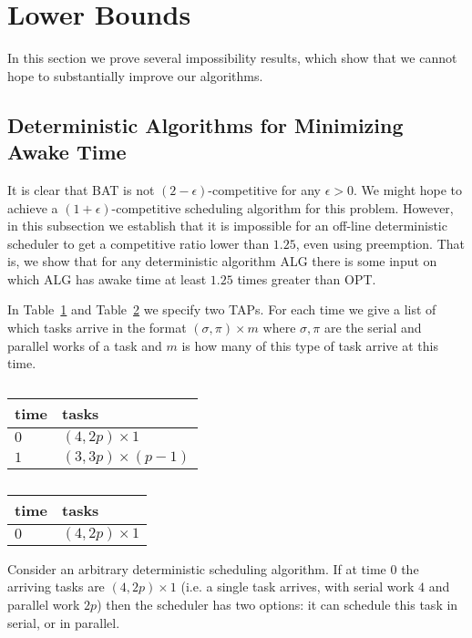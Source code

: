 \section{Lower Bounds}
\label{sec:lowerbounds}

In this section we prove several impossibility results, which
show that we cannot hope to substantially improve our algorithms.

\subsection{Deterministic Algorithms for Minimizing Awake Time}
It is clear that BAT is not $(2-\epsilon)$-competitive for any
$\epsilon > 0$. We might hope to achieve a
$(1+\epsilon)$-competitive scheduling algorithm for this problem.
However, in this subsection we establish that it is impossible
for an off-line deterministic scheduler to get a competitive
ratio lower than $1.25$, even using preemption. That is, we show
that for any deterministic algorithm ALG there is some input on
which ALG has awake time at least $1.25$ times greater than OPT. 

In Table~\ref{tab:lowerboundFork1} and
Table~\ref{tab:lowerboundFork2} we specify two TAPs.
For each time we give a list of which tasks arrive in the format
$(\sigma, \pi)\times m$ where $\sigma, \pi$ are the serial and
parallel works of a task and $m$ is how many of this type of task
arrive at this time.

\begin{table}[H]
\caption{}
\label{tab:lowerboundFork1}
\centering
\begin{tabular}{|l|l|}
\hline
time & tasks                    \\ \hline
$0$  & $(4, 2p) \times 1$       \\ \hline
$1$  & $(3, 3p) \times (p-1)$ \\ \hline
\end{tabular}
\end{table}

\begin{table}[H]
\caption{}
\label{tab:lowerboundFork2}
\centering
\begin{tabular}{|l|l|}
\hline
time & tasks                    \\ \hline
$0$  & $(4, 2p) \times 1$       \\ \hline
\end{tabular}
\end{table}

Consider an arbitrary deterministic scheduling algorithm. If at
time $0$ the arriving tasks are $(4, 2p)\times 1$ (i.e. a single
task arrives, with serial work $4$ and parallel work $2p$) then
the scheduler has two options: it can schedule this task in
serial, or in parallel.

